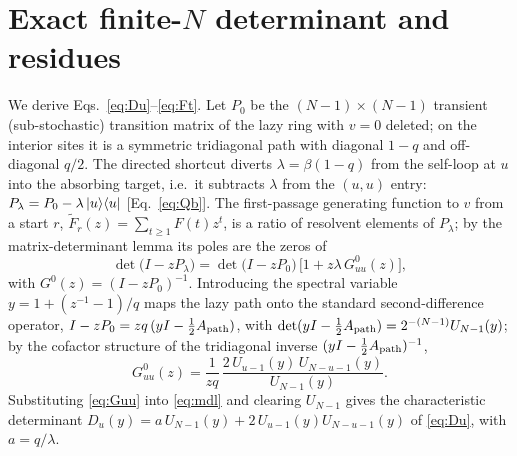 \documentclass[reprint,amsmath,amssymb,aps,prresearch,longbibliography]{revtex4-2}
\begin{document}
\section{Exact finite-\texorpdfstring{$N$}{N} determinant and residues}\label{app:det}
We derive Eqs.~\eqref{eq:Du}--\eqref{eq:Ft}. Let $P_0$ be the $(N-1)\times(N-1)$ transient
(sub-stochastic) transition matrix of the lazy ring with $v=0$ deleted; on the interior sites it is a
symmetric tridiagonal path with diagonal $1-q$ and off-diagonal $q/2$. The directed shortcut diverts
$\lambda=\beta(1-q)$ from the self-loop at $u$ into the absorbing target, i.e.\ it subtracts $\lambda$
from the $(u,u)$ entry: $P_\lambda=P_0-\lambda\ket{u}\!\bra{u}$ [Eq.~\eqref{eq:Qb}].
The first-passage generating function to $v$ from a start $r$, $\tilde F_r(z)=\sum_{t\ge1}F(t)z^t$, is a
ratio of resolvent elements of $P_\lambda$; by the matrix-determinant lemma its poles are the zeros of
\begin{equation}
\det\!\big(I-zP_\lambda\big)=\det\!\big(I-zP_0\big)\,\big[1+z\lambda\,G^{0}_{uu}(z)\big],
\label{eq:mdl}
\end{equation}
with $G^0(z)=(I-zP_0)^{-1}$. Introducing the spectral variable $y=1+(z^{-1}-1)/q$ maps the lazy path
onto the standard second-difference operator, $I-zP_0=zq\,(yI-\tfrac12A_{\rm path})$, with
$\det(yI-\tfrac12A_{\rm path})=2^{-(N-1)}U_{N-1}(y)$; by the cofactor structure of the tridiagonal
inverse $(yI-\tfrac12A_{\rm path})^{-1}$,
\begin{equation}
G^0_{uu}(z)=\frac{1}{zq}\,\frac{2\,U_{u-1}(y)\,U_{N-u-1}(y)}{U_{N-1}(y)} .
\label{eq:Guu}
\end{equation}
Substituting \eqref{eq:Guu} into \eqref{eq:mdl} and clearing $U_{N-1}$ gives the characteristic
determinant $D_u(y)=a\,U_{N-1}(y)+2\,U_{u-1}(y)U_{N-u-1}(y)$ of \eqref{eq:Du}, with $a=q/\lambda$.
\end{document}
